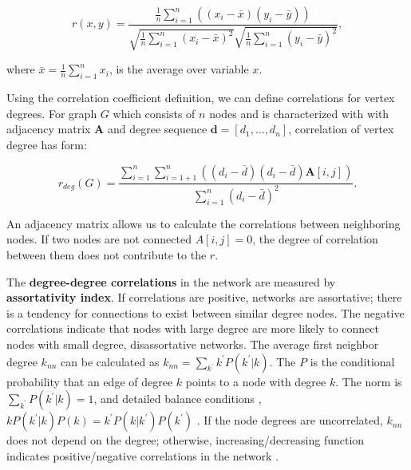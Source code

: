 \begin{equation}
r(x, y) = \frac{\frac{1}{n}\sum_{i=1}^{n}((x_i - \bar{x} ) (y_i - \bar{y}) )}{\sqrt{\frac{1}{n}\sum_{i=1}^{n}(x_i - \bar{x})^2} \sqrt{\frac{1}{n}\sum_{i=1}^{n}(y_i - \bar{y})^2} },
\end{equation}

where $\bar{x} = \frac{1}{n}\sum_{i=1}^{n}x_i$, is the average over variable $x$.

Using the correlation coefficient definition, we can define correlations for vertex degrees. For graph $G$ which consists of $n$ nodes and is characterized with with adjacency matrix $\boldsymbol{A}$ and degree sequence $\boldsymbol{d} = [d_1, ..., d_n]$, correlation of vertex degree has form:


\begin{equation}
r_{deg}(G) = \frac{\sum_{i=1}^{n}\sum_{i=1+1}^{n}((d_i - \bar{d}) (d_i - \bar{d}) \boldsymbol{A}[i,j] )}{\sum_{i=1}^{n}(d_i - \bar{d})^2}.
\end{equation}

An adjacency matrix allows us to calculate the correlations between neighboring nodes. If two nodes are not connected $A[i,j]=0$, the degree of correlation between them does not contribute to the $r$.

The \textbf{degree-degree correlations} in the network are measured by \textbf{assortativity index}. If correlations are positive, networks are assortative; there is a tendency for connections to exist between similar degree nodes. The negative correlations indicate that nodes with large degree are more likely to connect nodes with small degree, disassortative networks. The average first neighbor degree $k_{nn}$ can be calculated as $k_{nn} = \sum_{k^{'}}k^{'}P(k^{'}|{k})$. The $P$ is the conditional probability that an edge of degree $k$ points to a node with degree $k$. The norm is $\sum_{k^{'}}P(k^{'}|k)=1$, and detailed balance conditions \cite{boccaletti2006complex},  $kP(k^{'}|k)P(k) = k^{'}P(k|k^{'})P(k^{'})$ \cite{boccaletti2006complex}. If the node degrees are uncorrelated, $k_{nn}$ does not depend on the degree; otherwise, increasing/decreasing function indicates positive/negative correlations in the network \cite{park2003}.

